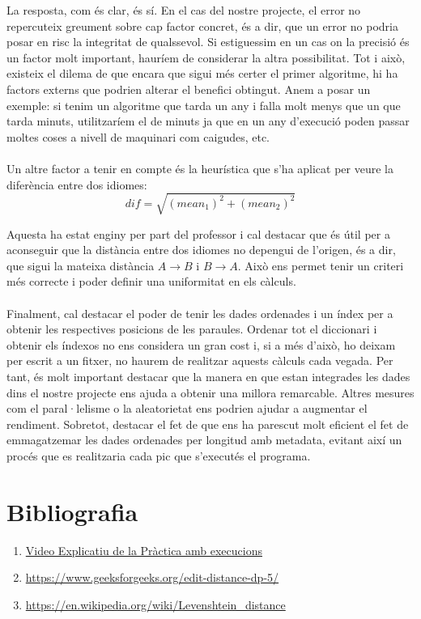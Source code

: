 \documentclass[conference]{IEEEtran}
\begin{document}
    

    La resposta, com és clar, és sí. En el cas del nostre projecte, el error no repercuteix greument sobre cap factor concret, és a dir, que un error no podria posar en risc la integritat de qualssevol. Si estiguessim en un cas on la precisió és un factor molt important, hauríem de considerar la altra possibilitat. Tot i això, existeix el dilema de que encara que sigui més certer el primer algoritme, hi ha factors externs que podrien alterar el benefici obtingut. Anem a posar un exemple: si tenim un algoritme que tarda un any i falla molt menys que un que tarda minuts, utilitzaríem el de minuts ja que en un any d'execució poden passar moltes coses a nivell de maquinari com caigudes, etc.\\\\

    Un altre factor a tenir en compte és la heurística que s'ha aplicat per veure la diferència entre dos idiomes:\\

    $$dif=\sqrt{(mean_1)^2+(mean_2)^2}$$

    Aquesta ha estat enginy per part del professor i cal destacar que és útil per a aconseguir que la distància entre dos idiomes no depengui de l'origen, és a dir, que sigui la mateixa distància $A\rightarrow B$ i $B\rightarrow A$. Això ens permet tenir un criteri més correcte i poder definir una uniformitat en els càlculs.\\\\

    Finalment, cal destacar el poder de tenir les dades ordenades i un índex per a obtenir les respectives posicions de les paraules. Ordenar tot el diccionari i obtenir els índexos no ens considera un gran cost i, si a més d'això, ho deixam per escrit a un fitxer, no haurem de realitzar aquests càlculs cada vegada. Per tant, és molt important destacar que la manera en que estan integrades les dades dins el nostre projecte ens ajuda a obtenir una millora remarcable. Altres mesures com el paral·lelisme  o la aleatorietat ens podrien ajudar a augmentar el rendiment. Sobretot, destacar el fet de que ens ha parescut molt eficient el fet de emmagatzemar les dades ordenades per longitud amb metadata, evitant així un procés que es realitzaria cada pic que s'executés el programa.


\section{Bibliografia}

\begin{enumerate}
    \item \href{https://youtu.be/fwJjpH5_WDg}{Video Explicatiu de la Pràctica amb execucions}
    \item \href{https://www.geeksforgeeks.org/edit-distance-dp-5/}{https://www.geeksforgeeks.org/edit-distance-dp-5/}
    \item \href{https://en.wikipedia.org/wiki/Levenshtein_distance}{https://en.wikipedia.org/wiki/Levenshtein\_distance}
\end{enumerate}
\end{document}
